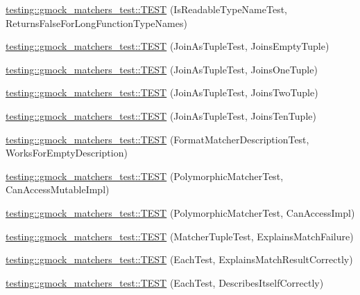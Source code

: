 \begin{DoxyCompactItemize}
\hyperlink{namespacetesting_1_1gmock__matchers__test_a30516b1c70e14132d1d87ab08b96aa2f}{testing\+::gmock\+\_\+matchers\+\_\+test\+::\+T\+E\+ST} (Is\+Readable\+Type\+Name\+Test, Returns\+False\+For\+Long\+Function\+Type\+Names)
\item 
\hyperlink{namespacetesting_1_1gmock__matchers__test_aa633c0b7e0f0316c23bff10e9963f773}{testing\+::gmock\+\_\+matchers\+\_\+test\+::\+T\+E\+ST} (Join\+As\+Tuple\+Test, Joins\+Empty\+Tuple)
\item 
\hyperlink{namespacetesting_1_1gmock__matchers__test_acaec7fcf41bb1cdf7124b443e7ab28e8}{testing\+::gmock\+\_\+matchers\+\_\+test\+::\+T\+E\+ST} (Join\+As\+Tuple\+Test, Joins\+One\+Tuple)
\item 
\hyperlink{namespacetesting_1_1gmock__matchers__test_a0831a9160c5420fcd363e4a520f0fb61}{testing\+::gmock\+\_\+matchers\+\_\+test\+::\+T\+E\+ST} (Join\+As\+Tuple\+Test, Joins\+Two\+Tuple)
\item 
\hyperlink{namespacetesting_1_1gmock__matchers__test_a56811b12ff298040a3d44dba0a2e4a8e}{testing\+::gmock\+\_\+matchers\+\_\+test\+::\+T\+E\+ST} (Join\+As\+Tuple\+Test, Joins\+Ten\+Tuple)
\item 
\hyperlink{namespacetesting_1_1gmock__matchers__test_ae104f652fab7d1b3c3873f6987401481}{testing\+::gmock\+\_\+matchers\+\_\+test\+::\+T\+E\+ST} (Format\+Matcher\+Description\+Test, Works\+For\+Empty\+Description)
\item 
\hyperlink{namespacetesting_1_1gmock__matchers__test_ae29925e94a9396fe3c7fab6efaff8d8a}{testing\+::gmock\+\_\+matchers\+\_\+test\+::\+T\+E\+ST} (Polymorphic\+Matcher\+Test, Can\+Access\+Mutable\+Impl)
\item 
\hyperlink{namespacetesting_1_1gmock__matchers__test_a918a64c4594ef6b30f53d735c2e6e6ac}{testing\+::gmock\+\_\+matchers\+\_\+test\+::\+T\+E\+ST} (Polymorphic\+Matcher\+Test, Can\+Access\+Impl)
\item 
\hyperlink{namespacetesting_1_1gmock__matchers__test_abc9816afa3c83fc92e2c6ecfb2dd8e63}{testing\+::gmock\+\_\+matchers\+\_\+test\+::\+T\+E\+ST} (Matcher\+Tuple\+Test, Explains\+Match\+Failure)
\item 
\hyperlink{namespacetesting_1_1gmock__matchers__test_adf46df588332aa839b52af952fface1a}{testing\+::gmock\+\_\+matchers\+\_\+test\+::\+T\+E\+ST} (Each\+Test, Explains\+Match\+Result\+Correctly)
\item 
\hyperlink{namespacetesting_1_1gmock__matchers__test_a183c4b7acec060c6fe3dee650bc97e6d}{testing\+::gmock\+\_\+matchers\+\_\+test\+::\+T\+E\+ST} (Each\+Test, Describes\+Itself\+Correctly)

\end{DoxyCompactItemize}
